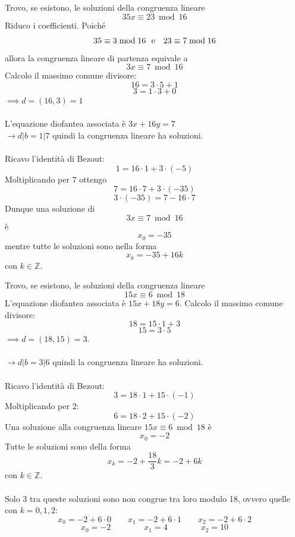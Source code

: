 \documentclass[a4paper,12pt, oneside]{book}
\begin{document}
		\begin{shaded}
			\begin{esempio}
				Trovo, se esistono, le soluzioni della congruenza lineare 
				$$35x \equiv 23 \bmod 16$$	
				Riduco i coefficienti. Poiché $$35 \equiv 3 \bmod 16 \mbox{\space \space e \space \space} 23 \equiv 7 \bmod 16$$
				allora la congruenza lineare di partenza equivale a 
				$$3x \equiv 7 \bmod 16$$
				Calcolo il massimo comune divisore:
				$$16 = 3 \cdot 5 + 1$$
				$$3 = 1 \cdot 3 + 0$$
				$\implies d = (16,3) = 1$\\\\
				L'equazione diofantea associata è $3x+16y=7$\\
				$\longrightarrow d|b = 1|7$ quindi la congruenza lineare ha soluzioni.\\\\
				Ricavo l'identità di Bezout:
				$$1 = 16 \cdot 1 + 3 \cdot (-5)$$
				Moltiplicando per $7$ ottengo
				$$7 = 16 \cdot 7 + 3 \cdot (-35)$$
				$$3 \cdot (-35) = 7 - 16 \cdot 7$$
				Dunque una soluzione di $$3x \equiv 7 \bmod 16$$ è
				$$x_0 = -35$$
				mentre tutte le soluzioni sono nella forma
				$$x_k = -35 + 16k$$ con $k \in \mathbb{Z}$.
			\end{esempio}
			\begin{esempio}
				Trovo, se esistono, le soluzioni della congruenza lineare
				$$15x \equiv 6 \bmod 18$$
				L'equazione diofantea associata è $15x+18y=6$.
				Calcolo il massimo comune divisore:
				$$18 = 15 \cdot 1 + 3$$
				$$15 = 3 \cdot 5$$
				$\implies d = (18,15) = 3$.\\\\
				$\longrightarrow d|b = 3|6$ quindi la congruenza lineare ha soluzioni.\\\\
				Ricavo l'identità di Bezout:
				$$3 = 18 \cdot 1 + 15 \cdot (-1)$$
				Moltiplicando per $2$:
				$$6 = 18 \cdot 2 + 15 \cdot (-2)$$
				Una soluzione alla congruenza lineare $15x \equiv 6 \bmod 18$ è
				$$x_0 = -2$$
				Tutte le soluzioni sono della forma
				$$x_k = -2 + \frac{18}{3}k = -2 +6k$$ con $k \in \mathbb{Z}$.\\\\
				Solo $3$ tra queste soluzioni sono non congrue tra loro modulo 18, ovvero quelle con $k = 0,1,2$:
				$$x_0 = -2+6 \cdot 0 \qquad x_1 = -2+6 \cdot 1 \qquad x_2 = -2+6 \cdot 2$$
				$$x_0 = -2 \qquad\qquad x_1 = 4 \qquad\qquad x_2 = 10$$
			\end{esempio}
		\end{shaded}
	
\end{document}
